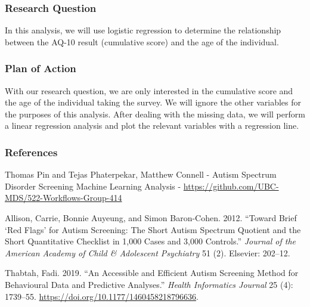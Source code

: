 \documentclass[]{article}
\begin{document}
\hypertarget{research-question}{%
\subsubsection{Research Question}\label{research-question}}

In this analysis, we will use logistic regression to determine the
relationship between the AQ-10 result (cumulative score) and the age of
the individual.

\hypertarget{plan-of-action}{%
\subsubsection{Plan of Action}\label{plan-of-action}}

With our research question, we are only interested in the cumulative
score and the age of the individual taking the survey. We will ignore
the other variables for the purposes of this analysis. After dealing
with the missing data, we will perform a linear regression analysis and
plot the relevant variables with a regression line.

\hypertarget{references}{%
\subsubsection{References}\label{references}}

Thomas Pin and Tejas Phaterpekar, Matthew Connell - Autism Spectrum
Disorder Screening Machine Learning Analysis -
\url{https://github.com/UBC-MDS/522-Workflows-Group-414}

\hypertarget{refs}{}
\leavevmode\hypertarget{ref-allison2012toward}{}%
Allison, Carrie, Bonnie Auyeung, and Simon Baron-Cohen. 2012. ``Toward
Brief `Red Flags' for Autism Screening: The Short Autism Spectrum
Quotient and the Short Quantitative Checklist in 1,000 Cases and 3,000
Controls.'' \emph{Journal of the American Academy of Child \& Adolescent
Psychiatry} 51 (2). Elsevier: 202--12.

\leavevmode\hypertarget{ref-Fadi}{}%
Thabtah, Fadi. 2019. ``An Accessible and Efficient Autism Screening
Method for Behavioural Data and Predictive Analyses.'' \emph{Health
Informatics Journal} 25 (4): 1739--55.
\url{https://doi.org/10.1177/1460458218796636}.
\end{document}
